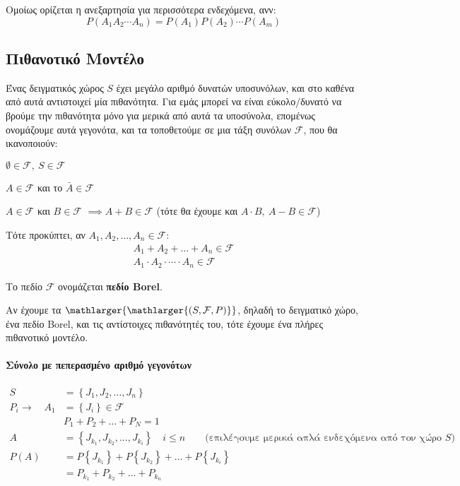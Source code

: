 \documentclass[11pt,a4paper,notitlepage,fleqn,final]{article}
\begin{document}
	Ομοίως ορίζεται η ανεξαρτησία για περισσότερα ενδεχόμενα, ανν:
	\[
	P(A_1A_2\cdots A_n) = P(A_1)P(A_2)\cdots P(A_m)
	\]

	\subsection{Πιθανοτικό Μοντέλο}
	Ένας δειγματικός χώρος \( S \) έχει μεγάλο αριθμό δυνατών υποσυνόλων,
	και στο καθένα από αυτά αντιστοιχεί μία πιθανότητα. Για εμάς μπορεί
	να είναι εύκολο/δυνατό να βρούμε την πιθανότητα μόνο για μερικά
	από αυτά τα υποσύνολα, επομένως ονομάζουμε αυτά γεγονότα, και τα
	τοποθετούμε σε μια τάξη συνόλων \( \mathcal F \), που θα ικανοποιούν:

	\begin{enumroman}
		\item \( \emptyset \in \mathcal F,\
		S \in \mathcal{F}
		 \)
		\item \( A \in \mathcal F \) και το \( \bar A \in \mathcal F \)
		\item \( A \in \mathcal F \) και \( B \in \mathcal F \)
		\( \implies A + B \in \mathcal F \) \quad
		(τότε θα έχουμε και \( A\cdot B,\ A-B \in \mathcal F \))
	\end{enumroman}

	Τότε προκύπτει, αν \( A_1,A_2,\dots,A_n \in \mathcal F \):
	\begin{gather*}
		A_1+A_2+\dots +A_n \in \mathcal F \\
		A_1\cdot A_2 \cdot \cdots \cdot A_n \in \mathcal F
	\end{gather*}

	Το πεδίο \( \mathcal F \) ονομάζεται \textbf{πεδίο Borel}.

	Αν έχουμε τα \( \mathlarger{\mathlarger{(S,\mathcal F,P)}} \),
	δηλαδή το
	δειγματικό χώρο, ένα πεδίο Borel, και τις αντίστοιχες πιθανότητές
	του, τότε έχουμε ένα πλήρες πιθανοτικό μοντέλο.

	\paragraph{Σύνολο με πεπερασμένο αριθμό γεγονότων}
	\begin{align*}
		S &= \left\lbrace J_1,J_2,\dots,J_n \right\rbrace \\
		P_i \to \quad A_1 &=
		\left\lbrace J_i \right\rbrace \in \mathcal F \\
		& P_1+P_2+\dots+P_N = 1 \\
		A &= \left\lbrace J_{k_1},J_{k_2},\dots,J_{k_i} \right\rbrace
		\quad i \leq n \qquad \text{(επιλέγουμε μερικά
			απλά ενδεχόμενα από τον χώρο $S$)} \\
		P(A) &= P\left\lbrace J_{k_1} \right\rbrace +
		P\left\lbrace J_{k_2} \right\rbrace + \dots +
		P\left\lbrace J_{k_i} \right\rbrace \\ &=
		P_{k_1} + P_{k_2} + \dots + P_{k_n}
	\end{align*}
\end{document}
